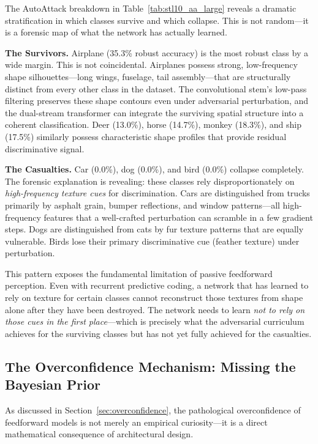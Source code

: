 \documentclass[12pt,a4paper]{article}
\begin{document}
The AutoAttack breakdown in Table~\ref{tab:stl10_aa_large} reveals a
dramatic stratification in which classes survive and which collapse. This is
not random---it is a forensic map of what the network has actually learned.

\textbf{The Survivors.} Airplane (35.3\% robust accuracy) is the most
robust class by a wide margin. This is not coincidental. Airplanes possess
strong, low-frequency shape silhouettes---long wings, fuselage, tail
assembly---that are structurally distinct from every other class in the
dataset. The convolutional stem's low-pass filtering preserves these shape
contours even under adversarial perturbation, and the dual-stream transformer
can integrate the surviving spatial structure into a coherent classification.
Deer (13.0\%), horse (14.7\%), monkey (18.3\%), and ship (17.5\%) similarly
possess characteristic shape profiles that provide residual discriminative
signal.

\textbf{The Casualties.} Car (0.0\%), dog (0.0\%), and bird (0.0\%) collapse
completely. The forensic explanation is revealing: these classes rely
disproportionately on \textit{high-frequency texture cues} for discrimination.
Cars are distinguished from trucks primarily by asphalt grain, bumper reflections,
and window patterns---all high-frequency features that a well-crafted
perturbation can scramble in a few gradient steps. Dogs are distinguished from
cats by fur texture patterns that are equally vulnerable. Birds lose their
primary discriminative cue (feather texture) under perturbation.

This pattern exposes the fundamental limitation of passive feedforward
perception. Even with recurrent predictive coding, a network that has
learned to rely on texture for certain classes cannot reconstruct those
textures from shape alone after they have been destroyed. The network
needs to learn \textit{not to rely on those cues in the first place}---which
is precisely what the adversarial curriculum achieves for the surviving
classes but has not yet fully achieved for the casualties.

\subsection{The Overconfidence Mechanism: Missing the Bayesian Prior}

As discussed in Section~\ref{sec:overconfidence}, the pathological
overconfidence of feedforward models is not merely an empirical curiosity---it
is a direct mathematical consequence of architectural design.
\end{document}
